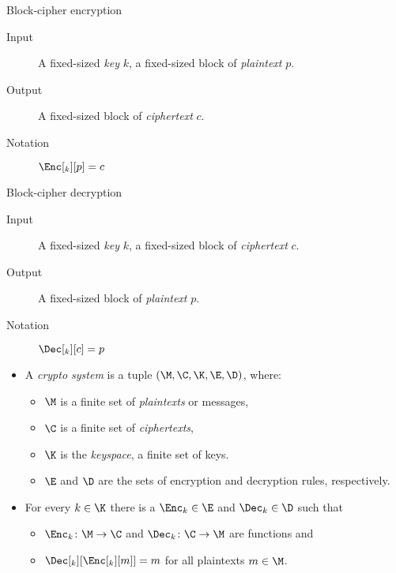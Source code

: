 \begin{frame}
  \begin{block}{Block-cipher encryption}
    \begin{description}
      \item[Input] A fixed-sized \emph{key} \(k\), a fixed-sized block of 
        \emph{plaintext} \(p\).
      \item[Output] A fixed-sized block of \emph{ciphertext} \(c\).
      \item[Notation] \(\Enc[_k][p] = c\)
    \end{description}
  \end{block}

  \pause{}

  \begin{block}{Block-cipher decryption}
    \begin{description}
      \item[Input] A fixed-sized \emph{key} \(k\), a fixed-sized block of 
        \emph{ciphertext} \(c\).
      \item[Output] A fixed-sized block of \emph{plaintext} \(p\).
      \item[Notation] \(\Dec[_k][c] = p\)
    \end{description}
  \end{block}
\end{frame}

\begin{frame}
  \begin{definition}\label{CryptoSystem}
    \begin{itemize}
        \item A \emph{crypto system} is a tuple \((\M, \C, \K, \E, \D)\), 
          where:
          \begin{itemize}
            \item \(\M\) is a finite set of \emph{plaintexts} or messages,
            \item \(\C\) is a finite set of \emph{ciphertexts},
            \item \(\K\) is the \emph{keyspace}, a finite set of keys.
            \item \(\E\) and \(\D\) are the sets of encryption and decryption
              rules, respectively.
          \end{itemize}

          \pause{}

        \item For every \(k\in \K\) there is a
          \(\Enc_k\in \E\) and
          \(\Dec_k\in \D\) such that
          \begin{itemize}
            \item \(\Enc_k\colon \M\to \C\) and \(\Dec_k\colon \C\to \M\) are 
              functions and
            \item \(\Dec[_k][\Enc[_k][m]] = m\) for all plaintexts \(m\in \M\).
          \end{itemize}
      \end{itemize}
  \end{definition}
\end{frame}

